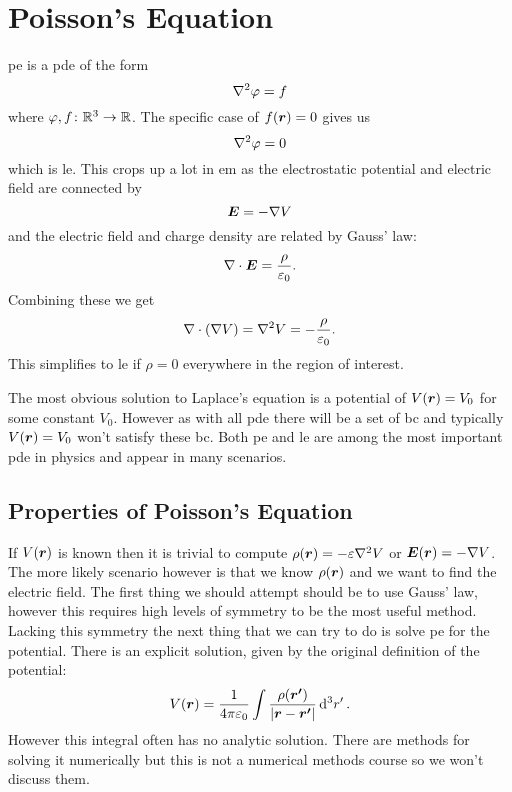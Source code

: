     \section{Poisson's Equation}
    \acrfull{pe} is a \acrfull{pde} of the form
    \[\nabla^2\varphi = f\]
    where \(\varphi, f\colon\mathbb{R}^3\to\mathbb{R}\).
    The specific case of \(f(\bm{r}) = 0\) gives us
    \[\nabla^2\varphi = 0\]
    which is \acrfull{le}.
    This crops up a lot in \acrshort{em} as the electrostatic potential and electric field are connected by
    \[\bm{E} = -\nabla V\]
    and the electric field and charge density are related by Gauss' law:
    \[\nabla\cdot\bm{E} = \frac{\rho}{\varepsilon_0}.\]
    Combining these we get
    \[\nabla\cdot(\nabla V) = \nabla^2 V = -\frac{\rho}{\varepsilon_0}.\]
    This simplifies to \acrshort{le} if \(\rho = 0\) everywhere in the region of interest.
    
    The most obvious solution to Laplace's equation is a potential of \(V(\bm{r}) = V_0\) for some constant \(V_0\).
    However as with all \acrshort{pde} there will be a set of \acrfull{bc} and typically \(V(\bm{r}) = V_0\) won't satisfy these \acrshort{bc}.
    Both \acrshort{pe} and \acrshort{le} are among the most important \acrshort{pde} in physics and appear in many scenarios.
    
    \subsection{Properties of Poisson's Equation}
    If \(V(\bm{r})\) is known then it is trivial to compute \(\rho(\bm{r}) = -\varepsilon\nabla^2 V\) or \(\bm{E}(\bm{r}) = -\nabla V\).
    The more likely scenario however is that we know \(\rho(\bm{r})\) and we want to find the electric field.
    The first thing we should attempt should be to use Gauss' law, however this requires high levels of symmetry to be the most useful method.
    Lacking this symmetry the next thing that we can try to do is solve \acrshort{pe} for the potential.
    There is an explicit solution, given by the original definition of the potential:
    \[V(\bm{r}) = \frac{1}{4\pi\varepsilon_0}\int\frac{\rho(\bm{r'})}{\abs{\bm{r} - \bm{r'}}}\dd[3]{r'}.\]
    However this integral often has no analytic solution.
    There are methods for solving it numerically but this is not a numerical methods course so we won't discuss them.
    
